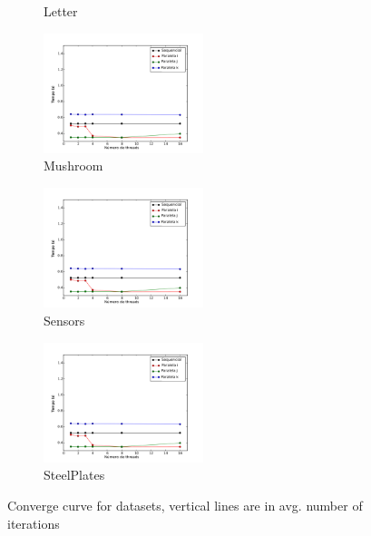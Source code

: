 \begin{figure}[H]
\begin{subfigure}{.3\textwidth}
			\caption{Letter}
			\label{fig:letter}
		\end{subfigure}
		\begin{subfigure}{.3\textwidth}
			\centering
			\includegraphics[height=3.5cm]{images/mushroom}
			\caption{Mushroom}
			\label{fig:mushroom}
		\end{subfigure}
		\begin{subfigure}{.3\textwidth}
			\centering
			\includegraphics[height=3.5cm]{images/sensors}
			\caption{Sensors}
			\label{fig:sensors}
		\end{subfigure}
		\begin{subfigure}{.3\textwidth}
			\centering
			\includegraphics[height=3.5cm]{images/steelPlates}
			\caption{SteelPlates}
			\label{fig:steelplates}
		\end{subfigure}
		\caption{Converge curve for datasets, vertical lines are in avg. number of iterations}
		\label{fig:converge}
	\end{figure}

